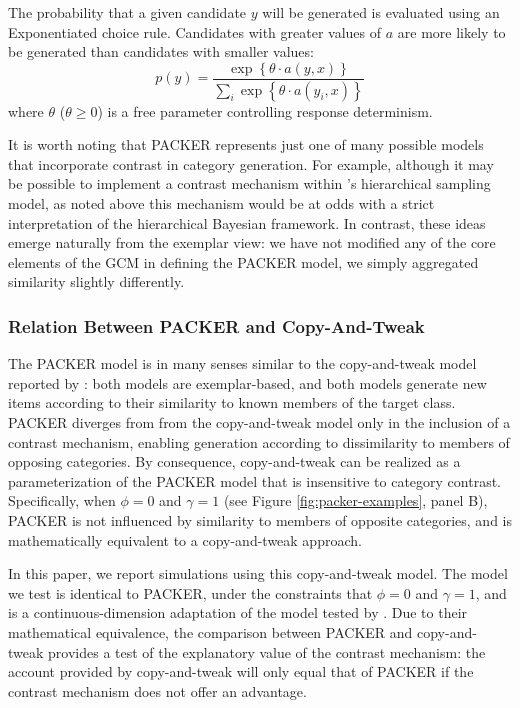 \documentclass[12pt]{article}
\newcommand\nbcnote[1]{\todo[inline, backgroundcolor = yellow]{\textbf{NBC}: #1}}
\begin{document}
\begin{flushleft}
The probability that a given candidate $y$ will be generated is evaluated using an Exponentiated \citet{luce1977choice} choice rule. Candidates with greater values of $a$ are more likely to be generated than candidates with smaller values:
% 
\begin{equation}
p(y) = \dfrac
{ \exp  \left \{ \theta \cdot a \left( y, x \right) \right \} } 
{ \sum_i{ \exp  \left \{ \theta \cdot a \left( y_i, x \right) \right\}  } }
\label{eq:packer-choice}
\end{equation}
% 
where $\theta$ ($\theta \geq 0$) is a free parameter controlling response determinism. 

It is worth noting that PACKER represents just one of many possible models that incorporate contrast in category generation. For example, although it may be possible to implement a contrast mechanism within \cite{jern2013probabilistic}'s hierarchical sampling model, as noted above this mechanism would be at odds with a strict interpretation of the hierarchical Bayesian framework. In contrast, these ideas emerge naturally from the exemplar view: we have not modified any of the core elements of the GCM in defining the PACKER model, we simply aggregated similarity slightly differently. \nbcnote{That line about importance sampling can go here.}

\subsubsection{Relation Between PACKER and Copy-And-Tweak}

The PACKER model is in many senses similar to the copy-and-tweak model reported by \cite{jern2013probabilistic}: both models are exemplar-based, and both models generate new items according to their similarity to known members of the target class. PACKER diverges from from the copy-and-tweak model only in the inclusion of a contrast mechanism, enabling generation according to dissimilarity to members of opposing categories. By consequence, copy-and-tweak can be realized as a parameterization of the PACKER model that is insensitive to category contrast. Specifically, when $\phi = 0$ and $\gamma = 1$ (see Figure \ref{fig:packer-examples}, panel B), PACKER is not influenced by similarity to members of opposite categories, and is mathematically equivalent to a copy-and-tweak approach.

In this paper, we report simulations using this copy-and-tweak model. The model we test is identical to PACKER, under the constraints that $\phi = 0$ and $\gamma = 1$, and is a continuous-dimension adaptation of the model tested by \cite{jern2013probabilistic}. Due to their mathematical equivalence, the comparison between PACKER and copy-and-tweak provides a test of the explanatory value of the contrast mechanism: the account provided by copy-and-tweak will only equal that of PACKER if the contrast mechanism does not offer an advantage.



\end{flushleft}
\end{document}
